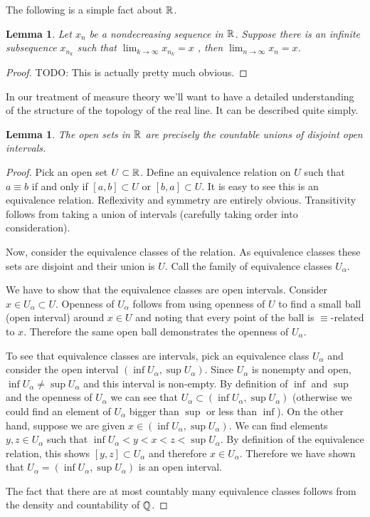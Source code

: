 \documentclass{amsart}
\newtheorem{lem}[thm]{Lemma}
\theoremstyle{remark}
\theoremstyle{definition}
\begin{document}
The following is a simple fact about $\mathbb{R}$.
\begin{lem}\label{IncreasingSequenceWithConvergentSubsequence}Let $x_n$ be a nondecreasing sequence in $\mathbb{R}$.  Suppose
  there is an infinite subsequence $x_{n_k}$ such that $\lim_{k \to
    \infty} x_{n_k} = x$ , then $\lim_{n \to \infty} x_n = x$.
\end{lem}
\begin{proof}
TODO:  This is actually pretty much obvious.
\end{proof}
In our treatment of measure theory we'll want to have a detailed
understanding of the structure of the topology of the real line.  It
can be described quite simply.
\begin{lem}\label{OpenSetsOfReals}The open sets in $\mathbb{R}$ are precisely the countable
  unions of disjoint open intervals.
\end{lem}
\begin{proof}Pick an open set $U \subset \mathbb{R}$.  Define an
  equivalence relation on $U$ such that $a \equiv b$ if and only if
  $[a,b] \subset U$ or $[b,a] \subset U$.  It is easy to see this is an equivalence
  relation.  Reflexivity and symmetry are entirely obvious.
  Transitivity follows from taking a union of intervals (carefully
  taking order into consideration).  

Now, consider the equivalence classes of the relation. As equivalence
classes these sets are disjoint and their union is $U$.  Call the
family of equivalence classes $U_\alpha$.

We have to show that
the equivalence classes are open intervals.  Consider $x \in U_\alpha
\subset U$.  Openness of $U_\alpha$ follows from using openness of $U$ to find a small ball (open interval) around $x \in U$ and noting that every
point of the ball is $\equiv$-related to $x$.  Therefore the same open
ball demonstrates the openness of $U_\alpha$.

To see that equivalence classes are intervals, pick an equivalence
class $U_\alpha$ and consider the open interval $(\inf U_\alpha, \sup
U_\alpha)$.  Since $U_\alpha$ is nonempty and open, $\inf U_\alpha \neq \sup
U_\alpha $ and this interval is non-empty.  By definition of $\inf$ and $\sup$ and the openness of
$U_\alpha$ we can see that $U_\alpha \subset (\inf U_\alpha, \sup
U_\alpha)$ (otherwise we could find an element of $U_\alpha$ bigger
than $\sup$ or less than $\inf$).  On the other hand, suppose we are
given $x \in (\inf U_\alpha, \sup U_\alpha)$.  We can find elements
$y,z \in U_\alpha$ such that $\inf U_\alpha  < y < x < z <\sup  U_\alpha$.
By definition of the equivalence relation, this shows $[y,z] \subset
U_\alpha$ and therefore $x \in U_\alpha$.  Therefore we have shown
that $U_\alpha =  (\inf U_\alpha, \sup U_\alpha)$ is an open interval.

The fact that there are
at most countably many equivalence classes follows from the density
and countability of $\mathbb{Q}$.
\end{proof} 
\end{document}
